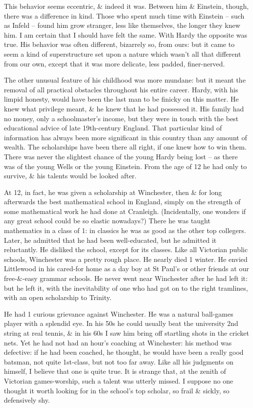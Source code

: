 \documentclass{article}
\numberwithin{equation}{section}
\begin{document}
This behavior seems eccentric, \& indeed it was. Between him \& Einstein, though, there was a difference in kind. Those who spent much time with Einstein -- such as Infeld -- found him grow stranger, less like themselves, the longer they knew him. I am certain that I should have felt the same. With Hardy the opposite was true. His behavior was often different, bizarrely so, from ours: but it came to seem a kind of superstructure set upon a nature which wasn't all that different from our own, except that it was more delicate, less padded, finer-nerved.

The other unusual feature of his childhood was more mundane: but it meant the removal of all practical obstacles throughout his entire career. Hardy, with his limpid honesty, would have been the last man to be finicky on this matter. He knew what privilege meant, \& he knew that he had possessed it. His family had no money, only a schoolmaster's income, but they were in touch with the best educational advice of late 19th-century England. That particular kind of information has always been more significant in this country than any amount of wealth. The scholarships have been there all right, if one knew how to win them. There was never the slightest chance of the young Hardy being lost -- as there was of the young Wells or the young Einstein. From the age of 12 he had only to survive, \& his talents would be looked after.

At 12, in fact, he was given a scholarship at Winchester, then \& for long afterwards the best mathematical school in England, simply on the strength of some mathematical work he had done at Cranleigh. (Incidentally, one wonders if any great school could be so elastic nowadays?) There he was taught mathematics in a class of 1: in classics he was as good as the other top collegers. Later, he admitted that he had been well-educated, but he admitted it reluctantly. He disliked the school, except for its classes. Like all Victorian public schools, Winchester was a pretty rough place. He nearly died 1 winter. He envied Littlewood in his cared-for home as a day boy at St Paul's or other friends at our free-\&-easy grammar schools. He never went near Winchester after he had left it: but he left it, with the inevitability of one who had got on to the right tramlines, with an open scholarship to Trinity.

He had 1 curious grievance against Winchester. He was a natural ball-games player with a splendid eye. In his 50s he could usually beat the university 2nd string at real tennis, \& in his 60s I saw him bring off startling shots in the cricket nets. Yet he had not had an hour's coaching at Winchester: his method was defective: if he had been coached, he thought, he would have been a really good batsman, not quite 1st-class, but not too far away. Like all his judgments on himself, I believe that one is quite true. It is strange that, at the zenith of Victorian games-worship, such a talent was utterly missed. I suppose no one thought it worth looking for in the school's top scholar, so frail \& sickly, so defensively shy.
\end{document}
